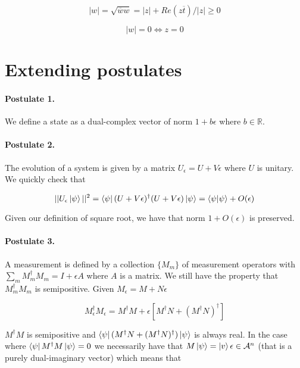 \documentclass{article}
\newcommand{\R}{\mathbb{R}}
\newcommand{\A}{\mathcal{A}}
\newcommand{\e}{\epsilon}
\renewcommand{\bar}{\overline}
\begin{document}
\begin{equation}
|w| = \sqrt{\bar{w}w} = |z| + Re(z\bar{t})/|z| \geq 0
\end{equation}

\begin{equation}
|w| = 0 \iff z = 0
\end{equation}

\section{Extending postulates}

\paragraph{Postulate 1.} We define a state as a dual-complex vector of norm $1 + b \e$ where $b \in \R$.

\paragraph{Postulate 2.} The evolution of a system is given by a matrix $U_{\e} = U + V \e$ where $U$ is unitary. We quickly check that

\begin{equation}
||U_{\e} \ket{\psi}||^2 = \bra{\psi} (U + V \e)^\dagger (U + V \e) \ket{\psi} = \braket{\psi | \psi} + O(\e)
\end{equation}

Given our definition of square root, we have that norm $1 + O(\e)$ is preserved.

\paragraph{Postulate 3.} A measurement is defined by a collection $\{M_m\}$ of measurement operators with $\sum_m M_m^\dagger M_m = I + \e A$ where $A$ is a matrix. We still have the property that $M_m^\dagger M_m$ is semipositive. Given $M_{\e} = M + N \e$

\begin{equation}
M_{\e}^\dagger M_{\e} = M^\dagger M + \e[M^\dagger N + (M^\dagger N)^\dagger]
\end{equation}

$M^\dagger M$ is semipositive and $\bra{\psi} (M^\dagger N + (M^\dagger N)^\dagger) \ket{\psi}$ is always real. In the case where $\bra{\psi} M^\dagger M \ket{\psi} = 0$ we necessarily have that $M \ket{\psi} = \ket{v} \e \in \A^n$ (that is a purely dual-imaginary vector) which means that
\end{document}
